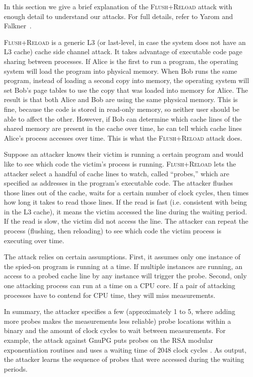 \documentclass[letterpaper,twocolumn,10pt]{article}
\begin{document}
In this section we give a brief explanation of the \textsc{Flush+Reload} attack
with enough detail to understand our attacks. For full details, refer to
Yarom and Falkner~\cite{yarom2013flush}.

\textsc{Flush+Reload} is a generic L3 (or last-level, in case the system does
not have an L3 cache) cache side channel attack. It takes advantage of
executable code page sharing between processes. If Alice is the first to run
a program, the operating system will load the program into physical memory. When
Bob runs the same program, instead of loading a second copy into memory, the
operating system will set Bob's page tables to use the copy that was loaded into
memory for Alice. The result is that both Alice and Bob are using the same
physical memory. This is fine, because the code is stored in read-only memory,
so neither user should be able to affect the other. However, if Bob can
determine which cache lines of the shared memory are present in the cache over
time, he can tell which cache lines Alice's process accesses over time. This is
what the \textsc{Flush+Reload} attack does.

Suppose an attacker knows their victim is running a certain program and would
like to see which code the victim's process is running. \textsc{Flush+Reload}
lets the attacker select a handful of cache lines to watch, called ``probes,''
which are specified as addresses in the program's executable code.
The attacker flushes those lines out of the cache, waits for a certain number of
clock cycles, then times how long it takes to read those lines. If the read is
fast (i.e. consistent with being in the L3 cache), it means the victim accessed
the line during the waiting period. If the read is slow, the victim did not
access the line. The attacker can repeat the process (flushing, then reloading)
to see which code the victim process is executing over time.

The attack relies on certain assumptions.  First, it
assumes only one instance of the spied-on program is running at
a time. If multiple instances are running, an access to a probed cache line by
any instance will trigger the probe. Second, only one attacking process can run at
a time on a CPU core. If a pair of attacking processes have to contend for CPU
time, they will miss measurements.

In summary, the attacker specifies a few (approximately 1 to 5, where adding more
probes makes the measurements less reliable) probe locations within a binary and
the amount of clock cycles to wait between measurements.
For example, the attack against GnuPG puts probes on the RSA modular
exponentiation routines and uses a waiting time of 2048 clock cycles
\cite{yarom2013flush}.
As output, the attacker
learns the sequence of probes that were accessed during the waiting periods.
\end{document}
